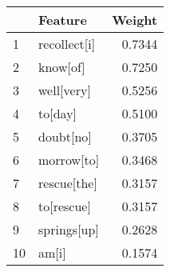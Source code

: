 \begin{tabular}{llr}
\toprule
{} &       Feature &  Weight \\
\midrule
1  &  recollect[i] &  0.7344 \\
2  &      know[of] &  0.7250 \\
3  &    well[very] &  0.5256 \\
4  &       to[day] &  0.5100 \\
5  &     doubt[no] &  0.3705 \\
6  &    morrow[to] &  0.3468 \\
7  &   rescue[the] &  0.3157 \\
8  &    to[rescue] &  0.3157 \\
9  &   springs[up] &  0.2628 \\
10 &         am[i] &  0.1574 \\
\bottomrule
\end{tabular}
